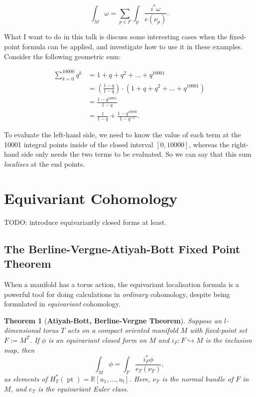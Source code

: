 \documentclass{article}
\newtheorem{theorem}{Theorem}[section]
\newcommand{\w}{\omega}
\newcommand{\RR}{\mathbb{R}}
\DeclareMathOperator{\pt}{pt}
\begin{document}
$$ \int_{M} \w = \sum\limits_{p \in F} \int_{p} \frac{i^{\ast}\w}{e(\nu_{p})}. $$

What I want to do in this talk is discuss some interesting cases when the fixed-point formula can be applied, and investigate how to use it in these examples. 
Consider the following geometric sum:

\begin{equation*}
	\begin{split}
		\sum\limits_{k=0}^{10000} q^{k} &= 1 + q + q^{2} + \ldots + q^{10001} \\
		&= \left(\frac{1-q}{1-q}\right)\cdot(1 + q + q^{2} + \ldots + q^{10001}) \\
		&= \frac{1 - q^{10001}}{1 - q} \\
		&= \frac{1}{1 - q} + \frac{1 - q^{10000}}{1 - q^{-1}}.
	\end{split}
\end{equation*}

To evaluate the left-hand side, we need to know the value of each term at the 10001 integral points inside of the closed interval $[0, 10000]$, whereas the right-hand side only needs the two terms to be evaluated. So we can say that this sum \emph{localises} at the end points.

\section{Equivariant Cohomology}

TODO: introduce equivariantly closed forms at least.


\subsection{The Berline-Vergne-Atiyah-Bott Fixed Point Theorem}

When a manifold has a torus action, the equivariant localisation formula is a powerful tool for doing calculations in \emph{ordinary} cohomology, despite being formulated in \emph{equivariant} cohomology.


\begin{theorem}[\textbf{Atiyah-Bott, Berline-Vergne Theorem}]
	Suppose an $l$-dimensional torus $T$ acts on a compact oriented manifold $M$ with fixed-point set $F := M^{T}$. If $\phi$ is an equivariant closed form on $M$ and $i_{F}: F \hookrightarrow M$ is the inclusion map, then
	\begin{equation*}
		\int_{M} \phi = \int_{F} \frac{i_{F}^{\ast} \phi}{e_{T}(\nu_{F})},
	\end{equation*}
	as elements of $H_{T}^{\ast}(\pt) = \RR[u_{1}, \ldots, u_{l}]$. Here, $\nu_{F}$ is the normal bundle of $F$ in $M$, and $e_{T}$ is the equivariant Euler class.
\end{theorem}
\end{document}
